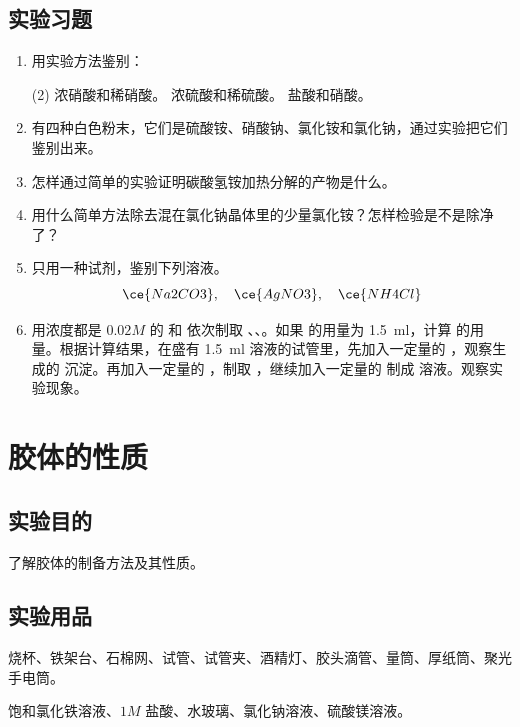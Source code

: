\subsection*{实验习题}
\begin{enumerate}[1.]
  \item 用实验方法鉴别：
  \begin{tasks}[item-indent=5em,label=\Alph*.,label-width=15pt](2)
    \task 浓硝酸和稀硝酸。
    \task 浓硫酸和稀硫酸。
    \task 盐酸和硝酸。
  \end{tasks}
  \item 有四种白色粉末，它们是硫酸铵、硝酸钠、氯化铵和氯化钠，通过实验把它们鉴别出来。
  \item 怎样通过简单的实验证明碳酸氢铵加热分解的产物是什么。
  \item 用什么简单方法除去混在氯化钠晶体里的少量氯化铵？怎样检验是不是除净了？
  \item 只用一种试剂，鉴别下列溶液。
  \[\ce{Na2CO3},\quad\ce{AgNO3},\quad\ce{NH4Cl}\]
  \item 用浓度都是 $0.02M$ 的  和  依次制取 、、。如果  的用量为 \qty{1.5}{ml}，计算  的用量。根据计算结果，在盛有 \qty{1.5}{ml}  溶液的试管里，先加入一定量的 ，观察生成的  沉淀。再加入一定量的 ，制取 ，继续加入一定量的  制成  溶液。观察实验现象。
\end{enumerate}



\section{胶体的性质}
\subsection*{实验目的}
了解胶体的制备方法及其性质。

\subsection*{实验用品}
烧杯、铁架台、石棉网、试管、试管夹、酒精灯、胶头滴管、量筒、厚纸筒、聚光手电筒。

饱和氯化铁溶液、$1M$ 盐酸、水玻璃、氯化钠溶液、硫酸镁溶液。
